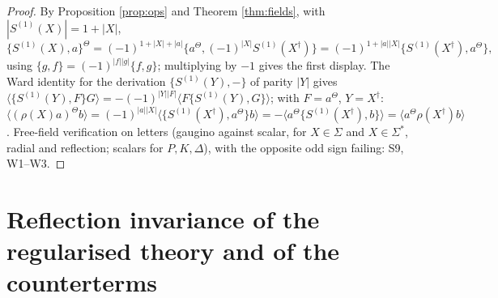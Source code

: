 \documentclass[11pt]{article}
\theoremstyle{definition}
\begin{document}
\begin{proof}
By Proposition \ref{prop:ops} and Theorem \ref{thm:fields}, with $|S^{(1)}(X)|=1+|X|$,
\[
\{S^{(1)}(X),a\}^{\Theta}=(-1)^{1+|X|+|a|}\{a^\Theta,(-1)^{|X|}S^{(1)}(X^\dagger)\}=(-1)^{1+|a||X|}\{S^{(1)}(X^\dagger),a^\Theta\},
\]
using $\{g,f\}=(-1)^{|f||g|}\{f,g\}$; multiplying by $-1$ gives the first display. The Ward identity for the derivation $\{S^{(1)}(Y),-\}$ of parity $|Y|$ gives $\langle\{S^{(1)}(Y),F\}G\rangle=-(-1)^{|Y||F|}\langle F\{S^{(1)}(Y),G\}\rangle$; with $F=a^\Theta$, $Y=X^\dagger$: $\langle(\rho(X)a)^\Theta b\rangle=(-1)^{|a||X|}\langle\{S^{(1)}(X^\dagger),a^\Theta\}b\rangle=-\langle a^\Theta\{S^{(1)}(X^\dagger),b\}\rangle=\langle a^\Theta\rho(X^\dagger)b\rangle$. Free-field verification on letters (gaugino against scalar, for $X\in\Sigma$ and $X\in\Sigma^*$, radial and reflection; scalars for $P,K,\Delta$), with the opposite odd sign failing: S9, W1--W3.
\end{proof}

\section{Reflection invariance of the regularised theory and of the counterterms}
\end{document}

